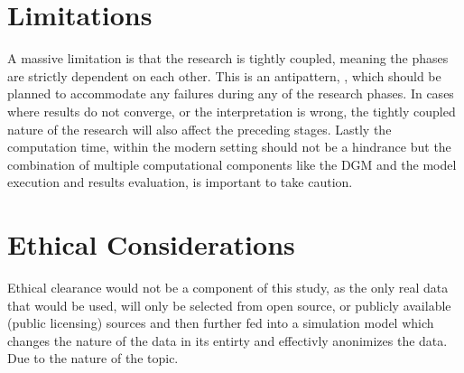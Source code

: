 \section{Limitations} \label{methlim}
A massive limitation is that the research is tightly coupled, meaning the phases are strictly dependent on each other. This is an antipattern, \parencite{joshi_beginning_2016}, which should be planned to accommodate any failures during any of the research phases. In cases where results do not converge, or the interpretation is wrong, the tightly coupled nature of the research will also affect the preceding stages. Lastly the computation time, within the modern setting should not be a hindrance but the combination of multiple computational components like the DGM and the model execution and results evaluation, is important to take caution. 

\section{Ethical Considerations}
Ethical clearance would not be a component of this study, as the only real data that would be used, will only be selected from open source, or publicly available (public licensing) sources and then further fed into a simulation model which changes the nature of the data in its entirty and effectivly anonimizes the data. Due to the nature of the topic. 
